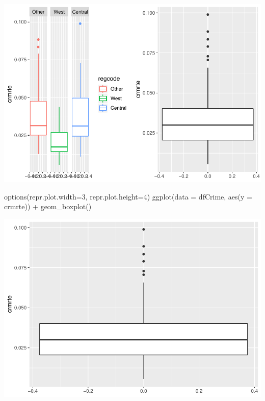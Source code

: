 \documentclass[]{article}
\newenvironment{Shaded}{}{}
\newcommand{\DataTypeTok}[1]{#1}
\newcommand{\DecValTok}[1]{#1}
\newcommand{\KeywordTok}[1]{\textcolor[rgb]{0.00,0.00,1.00}{#1}}
\newcommand{\NormalTok}[1]{#1}
\newcommand{\OperatorTok}[1]{#1}
\newcommand{\StringTok}[1]{\textcolor[rgb]{0.00,0.50,0.50}{#1}}
\begin{document}
\includegraphics{Bagnard_Gaustad_Hartman_Leung_Lab_3_files/figure-latex/unnamed-chunk-47-1.pdf}

\begin{Shaded}
\begin{Highlighting}[]
\KeywordTok{options}\NormalTok{(}\DataTypeTok{repr.plot.width=}\DecValTok{3}\NormalTok{, }\DataTypeTok{repr.plot.height=}\DecValTok{4}\NormalTok{)}
\KeywordTok{ggplot}\NormalTok{(}\DataTypeTok{data =}\NormalTok{ dfCrime, }\KeywordTok{aes}\NormalTok{(}\DataTypeTok{y =}\NormalTok{ crmrte)) }\OperatorTok{+}\StringTok{ }
\StringTok{      }\KeywordTok{geom_boxplot}\NormalTok{()}
\end{Highlighting}
\end{Shaded}

\includegraphics{Bagnard_Gaustad_Hartman_Leung_Lab_3_files/figure-latex/unnamed-chunk-48-1.pdf}
\end{document}
